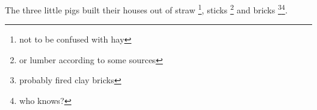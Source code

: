 \documentclass{article}
\begin{document}
The three little pigs built their houses out of straw \footnote{not to be
  confused with hay}, sticks \footnote{or lumber according to some sources}
and bricks \footnote{probably fired clay bricks}\footnote{who knows?}.
\end{document}
